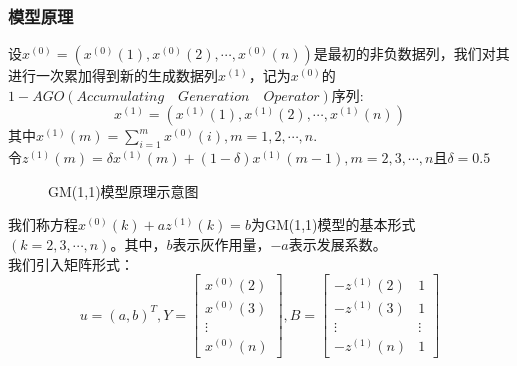 \documentclass[openany]{progbookcn}
\begin{document}
\subsubsection{模型原理}
\indent 设$x^{(0)}=(x^{(0)}(1),x^{(0)}(2),\cdots,x^{(0)}(n))$是最初的非负数据列，我们对其进行一次累加得到新的生成数据列$x^{(1)}$，记为$x^{(0)}$的$1-AGO(Accumulating\quad Generation\quad Operator)$序列:
\begin{equation}\nonumber
x^{(1)}=(x^{(1)}(1),x^{(1)}(2),\cdots,x^{(1)}(n))
\end{equation}
\indent 其中$x^{(1)}(m)=\mathop{\sum}\limits_{i=1}^m{x^{(0)}(i)},m=1,2,\cdots,n$.\\
\indent 令$z^{(1)}(m)=\delta x^{(1)}(m)+(1-\delta)x^{(1)}(m-1),m=2,3,\cdots,n$且$\delta=0.5$
\begin{figure}[H]
\centering
{}
\caption{GM(1,1)模型原理示意图}
\end{figure}
\indent 我们称方程$x^{(0)}(k)+az^{(1)}(k)=b$为GM(1,1)模型的基本形式$(k=2,3,\cdots,n)$。其中，$b$表示灰作用量，$-a$表示发展系数。\\
\indent 我们引入矩阵形式：
\begin{equation}\nonumber
u = {(a,b)^T},Y = \left[ {\begin{array}{*{20}{c}}
{{x^{(0)}}(2)}\\
{{x^{(0)}}(3)}\\
 \vdots \\
{{x^{(0)}}(n)}
\end{array}} \right],B = \left[ {\begin{array}{*{20}{c}}
{ - {z^{(1)}}(2)}&1\\
{ - {z^{(1)}}(3)}&1\\
 \vdots & \vdots \\
{ - {z^{(1)}}(n)}&1
\end{array}} \right]
\end{equation}
\end{document}
